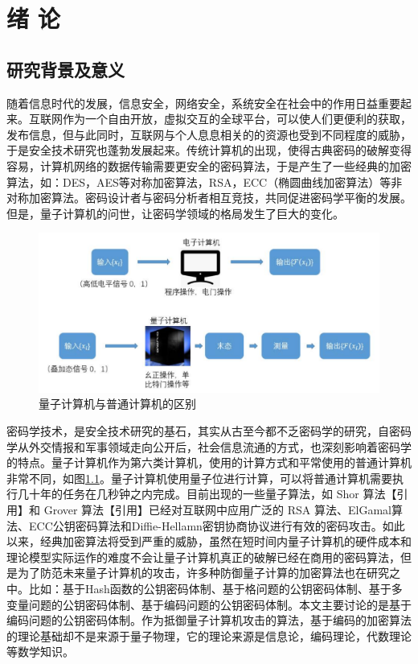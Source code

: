 \chapter{绪\hskip 0.4cm 论}
\label{chap1}

\section{研究背景及意义}
随着信息时代的发展，信息安全，网络安全，系统安全在社会中的作用日益重要起来。互联网作为一个自由开放，虚拟交互的全球平台，可以使人们更便利的获取，发布信息，但与此同时，互联网与个人息息相关的的资源也受到不同程度的威胁，于是安全技术研究也蓬勃发展起来。传统计算机的出现，使得古典密码的破解变得容易，计算机网络的数据传输需要更安全的密码算法，于是产生了一些经典的加密算法，如：DES，AES等对称加密算法，RSA，ECC（椭圆曲线加密算法）等非对称加密算法。密码设计者与密码分析者相互竞技，共同促进密码学平衡的发展。但是，量子计算机的问世，让密码学领域的格局发生了巨大的变化。

\begin{figure}[H]
	\centering
	\includegraphics[width=15 cm]{fig/quantum.pdf}
	\caption{量子计算机与普通计算机的区别} %
	\label{fig:quantum_pdf}
\end{figure}

密码学技术，是安全技术研究的基石，其实从古至今都不乏密码学的研究，自密码学从外交情报和军事领域走向公开后，社会信息流通的方式，也深刻影响着密码学的特点。量子计算机作为第六类计算机，使用的计算方式和平常使用的普通计算机非常不同，如图\ref{fig:quantum_pdf}。量子计算机使用量子位进行计算，可以将普通计算机需要执行几十年的任务在几秒钟之内完成。目前出现的一些量子算法，如 Shor 算法【引用】和 Grover 算法【引用】已经对互联网中应用广泛的 RSA 算法、ElGamal算法、ECC公钥密码算法和Diffie-Hellamn密钥协商协议进行有效的密码攻击。如此以来，经典加密算法将受到严重的威胁，虽然在短时间内量子计算机的硬件成本和理论模型实际运作的难度不会让量子计算机真正的破解已经在商用的密码算法，但是为了防范未来量子计算机的攻击，许多种防御量子计算的加密算法也在研究之中。比如：基于Hash函数的公钥密码体制、基于格问题的公钥密码体制、基于多变量问题的公钥密码体制、基于编码问题的公钥密码体制。本文主要讨论的是基于编码问题的公钥密码体制。作为抵御量子计算机攻击的算法，基于编码的加密算法的理论基础却不是来源于量子物理，它的理论来源是信息论，编码理论，代数理论等数学知识。

